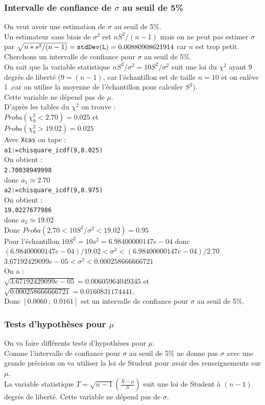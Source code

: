 \documentclass[a4paper,11pt]{book}
\begin{document}
\subsubsection{Intervalle de confiance de $\sigma$ au  seuil de 5\%} \label{sec:sigma3}
On veut avoir une estimation de $\sigma$ au  seuil de 5\%.\\
Un estimateur sans biais de $\sigma^2$ est $nS^2/(n-1)$ mais on ne peut pas 
estimer $\sigma$  par  $\sqrt{n*s^2/(n-1)}={\tt stdDev(L)}=0.00880908621914$ 
car $n$ est trop petit.\\
Cherchons un intervalle de confiance pour $\sigma$ au seuil de 5\%.\\
On sait que la variable statistique $nS^2/\sigma^2=10S^2/\sigma^2$ suit 
une loi du $\chi^2$ ayant $9$ degr\'es de libert\'e ($9=(n-1)$, car 
l'\'echantillon est de taille $n=10$ et on enl\`eve 1 ,car on utilise la
 moyenne de  l'\'echantillon pour calculer $S^2$).\\ 
Cette variable ne d\'epend pas de $\mu$.\\
D'apr\`es les tables du $\chi^2$ on trouve :\\
$Proba(\chi^2_{9}<2.70)=0.025$ et \\
$Proba(\chi^2_{9}>19.02)=0.025$\\ 
Avec {\tt Xcas} on tape :\\
{\tt a1:=chisquare\_icdf(9,0.025)}\\
On obtient :\\
{\tt 2.70038949998}\\
donc $a_1\simeq 2.70$\\
{\tt a2:=chisquare\_icdf(9,0.975)}\\
On obtient :\\
{\tt 19.0227677986}\\
donc $a_2\simeq 19.02$\\
Donc $Proba(2.70<10S^2/\sigma^2<19.02)=0.95$\\
Pour l'\'echantillon $10S^2=10s^2=6.98400000147e-04$ donc\\
$(6.98400000147e-04)/19.02<\sigma^2<(6.98400000147e-04)/2.70$\\
$3.67192429099e-05<\sigma^2<0.000258666666721$\\
On a :\\
$\sqrt{3.67192429099e-05}=0.00605964049345$ et\\
$\sqrt{0.000258666666721}=0.0160831174441$.\\
 Donc $[0.0060\ ;\ 0.0161]$ est un 
intervalle de confiance pour $\sigma$ au seuil de 5\%. 
\subsubsection{Tests d'hypoth\`eses pour $\mu$}
On va faire diff\'erents tests d'hypoth\`eses pour $\mu$.\\
Comme l'intervalle de confiance pour $\sigma$ au seuil de 5\% ne donne pas 
$\sigma$ avec une grande pr\'ecision on va utiliser la loi de Student pour 
avoir des renseignements sur $\mu$.\\
La variable statistique $T=\sqrt{n-1}(\frac{\bar X-\mu}{S})$ suit une loi de 
Student \`a 
$(n-1)$ degr\'es de libert\'e. Cette variable ne d\'epend pas de $\sigma$.\\
\end{document}
